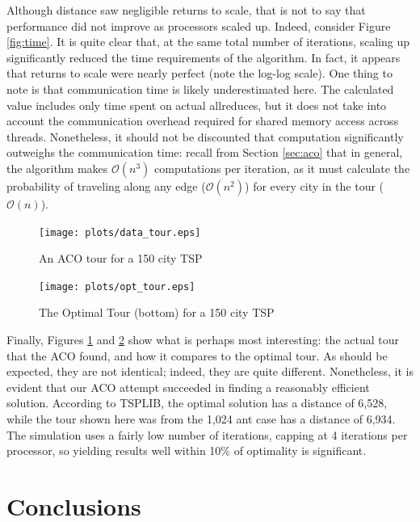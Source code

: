 \documentclass[twocolumn]{article}
\begin{document}
Although distance saw negligible returns to scale, that is not to say that 
performance did not improve as processors scaled up. Indeed, consider Figure
\ref{fig:time}. It is quite clear that, at the same total number of iterations,
scaling up significantly reduced the time requirements of the algorithm. In fact,
it appears that returns to scale were nearly perfect (note the log-log scale). 
One thing to note is that communication time is likely underestimated here. The
calculated value
includes only time spent on actual allreduces, but it does not take into account
the communication overhead required for shared memory access across threads. 
Nonetheless, it should not be discounted that computation significantly outweighs
the communication time: recall from Section \ref{sec:aco} that in general, the 
algorithm makes $\mathcal{O}(n^3)$ 
computations per iteration, as it must calculate the probability of traveling 
along any edge ($\mathcal{O}(n^2)$) for every city in the tour ($\mathcal{O}(n)$). \\

\begin{figure}[t]
  \centering
  \texttt{[image: plots/data\_tour.eps]}
  \caption{An ACO tour for a 150 city TSP} \label{fig:ourtour}
\end{figure}

\begin{figure}[ht]
  \centering
  \texttt{[image: plots/opt\_tour.eps]}
  \caption{The Optimal Tour (bottom) for a 150 city TSP} 
  \label{fig:opttour}
\end{figure}

Finally, Figures \ref{fig:ourtour} and \ref{fig:opttour} show what is perhaps 
most interesting: the actual tour that the ACO found, and how it compares to 
the optimal tour. As should be expected, they are not identical; indeed, 
they are quite different. Nonetheless, it is evident that our ACO attempt succeeded
in finding a reasonably efficient solution. According to TSPLIB, the optimal solution
has a distance of 6,528, while the tour shown here was from the 1,024 ant case
has a distance of 6,934. The simulation uses a fairly low number of iterations, 
capping at 4 iterations per processor, so yielding results well within 10\% of
optimality is significant. 

\section{Conclusions}
\end{document}
